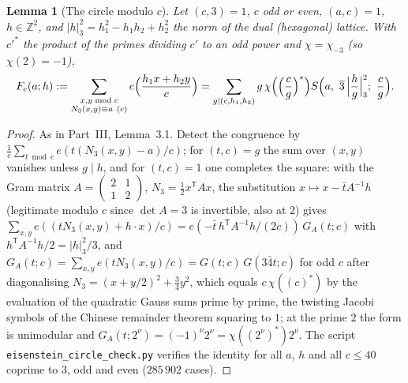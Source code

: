 \documentclass[11pt]{amsart}
\newtheorem{lemma}[theorem]{Lemma}
\theoremstyle{remark}
\newcommand{\Z}{\mathbb{Z}}
\begin{document}
\begin{lemma}[The circle modulo $c$]\label{lem:circle3}
Let $(c,3)=1$, $c$ odd or even, $(a,c)=1$, $h\in\Z^2$, and $|h|_3^2=h_1^2-h_1h_2+h_2^2$ the norm of the dual (hexagonal) lattice. With $c'^{*}$ the product of the primes dividing $c'$ to an odd power and $\chi=\chi_{-3}$ (so $\chi(2)=-1$),
\[
F_c(a;h):=\sum_{\substack{x,y\bmod c\\ N_3(x,y)\equiv a\ (c)}}e\Bigl(\frac{h_1x+h_2y}c\Bigr)=\sum_{g\mid(c,h_1,h_2)}g\,\chi\Bigl(\Bigl(\frac cg\Bigr)^{*}\Bigr)S\Bigl(a,\ \overline3\,\Bigl|\frac hg\Bigr|_3^2;\ \frac cg\Bigr).
\]
\end{lemma}
\begin{proof}
As in Part~III, Lemma~3.1. Detect the congruence by $\frac1c\sum_{t\bmod c}e(t(N_3(x,y)-a)/c)$; for $(t,c)=g$ the sum over $(x,y)$ vanishes unless $g\mid h$, and for $(t,c)=1$ one completes the square: with the Gram matrix $A=\left(\begin{smallmatrix}2&1\\1&2\end{smallmatrix}\right)$, $N_3=\frac12x^{\mathsf T}Ax$, the substitution $x\mapsto x-\bar tA^{-1}h$ (legitimate modulo $c$ since $\det A=3$ is invertible, also at $2$) gives $\sum_{x,y}e((tN_3(x,y)+h\cdot x)/c)=e(-\bar t\,h^{\mathsf T}A^{-1}h/(2c))\,G_A(t;c)$ with $h^{\mathsf T}A^{-1}h/2=|h|_3^2/3$, and $G_A(t;c)=\sum_{x,y}e(tN_3(x,y)/c)=G(t;c)\,G(3\bar4t;c)$ for odd $c$ after diagonalising $N_3=(x+y/2)^2+\frac34y^2$, which equals $c\,\chi((c)^{*})$ by the evaluation of the quadratic Gauss sums prime by prime, the twisting Jacobi symbols of the Chinese remainder theorem squaring to $1$; at the prime $2$ the form is unimodular and $G_A(t;2^\nu)=(-1)^\nu2^\nu=\chi((2^\nu)^{*})2^\nu$. The script \texttt{eisenstein\_circle\_check.py} verifies the identity for all $a$, $h$ and all $c\le40$ coprime to $3$, odd and even ($285\,902$ cases).
\end{proof}
\end{document}
